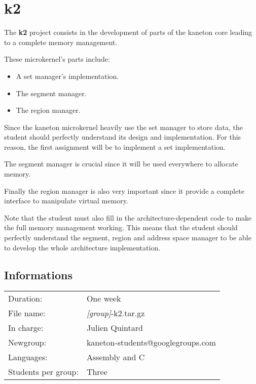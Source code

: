 
%
%

\chapter{k2}

The \textbf{k2} project consists in the development of parts of
the kaneton core leading to a complete memory management.

These microkernel's parts include:

\begin{itemize}
  \item
    A set manager's implementation.
  \item
    The segment manager.
  \item
    The region manager.
\end{itemize}

Since the kaneton microkernel heavily use the set manager to store data,
the student should perfectly understand its design and implementation.
For this reason, the first assignment will be to implement a set
implementation.

The segment manager is crucial since it will be used everywhere to allocate
memory.

Finally the region manager is also very important since it provide a complete
interface to manipulate virtual memory.

Note that the student must also fill in the architecture-dependent code
to make the full memory management working. This means that the student
should perfectly understand the segment, region and address space manager
to be able to develop the whole architecture implementation.

\newpage

%
%

\section{Informations}

\begin{tabular}{p{7cm}l}
Duration: & One week \\
File name: & \textit{[group]}-k2.tar.gz \\
In charge: & Julien Quintard \\
Newgroup: & kaneton-students@googlegroups.com \\
Languages: & Assembly and C \\
Students per group: & Three \\
\end{tabular}

